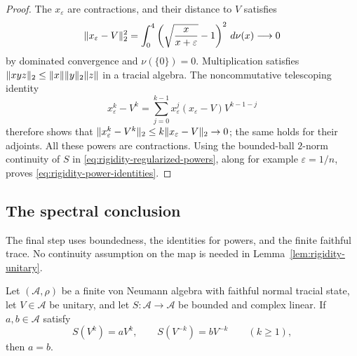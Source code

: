 \begin{proof}
The $x_\varepsilon$ are contractions, and their distance to $V$
satisfies
\[
 \lVert x_\varepsilon-V\rVert_2^2
 =\int_0^4
   \left(\sqrt{\frac{x}{x+\varepsilon}}-1\right)^2\,d\nu(x)
 \longrightarrow0
\]
by dominated convergence and $\nu(\{0\})=0$.  Multiplication satisfies
$\lVert xyz\rVert_2\leq\lVert x\rVert\lVert y\rVert_2\lVert z\rVert$ in a tracial algebra.
The noncommutative telescoping identity
\[
 x_\varepsilon^k-V^k
 =\sum_{j=0}^{k-1}x_\varepsilon^j
                  (x_\varepsilon-V)V^{k-1-j}
\]
therefore shows that
$\lVert x_\varepsilon^k-V^k\rVert_2\leq k\lVert x_\varepsilon-V\rVert_2\to0$;
the same holds for their adjoints.  All these powers are contractions.
Using the bounded-ball $2$-norm continuity of $S$ in
\eqref{eq:rigidity-regularized-powers}, along for example
$\varepsilon=1/n$, proves \eqref{eq:rigidity-power-identities}.
\end{proof}

\subsection{The spectral conclusion}

The final step uses boundedness, the identities for powers, and the
finite faithful trace. No continuity assumption on the map is needed
in Lemma~\ref{lem:rigidity-unitary}.

\begin{lemma}\label{lem:rigidity-unitary}
Let $(\mathcal A,\rho)$ be a finite von Neumann algebra with faithful
normal tracial state, let $V\in\mathcal A$ be unitary, and let
$S:\mathcal A\to\mathcal A$ be bounded and complex linear.  If
$a,b\in\mathcal A$ satisfy
\[
 S(V^k)=aV^k,\qquad S(V^{-k})=bV^{-k}\qquad(k\geq1),
\]
then $a=b$.
\end{lemma}

